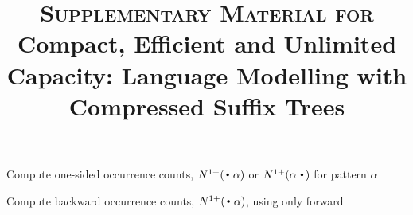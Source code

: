 \documentclass[11pt,a4paper]{article}
\title{\textsc{Supplementary Material for} \\
Compact, Efficient and Unlimited Capacity:
    Language Modelling with Compressed Suffix Trees}
\date{}
\begin{document}
\maketitle

\begin{algorithm}[htpb]
  \caption{Compute one-sided occurrence counts, $\nlplus{\dotpat}$ or $\nlplus{\patdot}$ for pattern $\alpha$ 
    \label{alg:n1plus}}
  \begin{algorithmic}[1]
        \EndIf
      \State {}
    \EndFunction
  \end{algorithmic}
\label{alg-nlplus}
\end{algorithm}


\begin{algorithm*}[htpb]
  \caption{Compute backward occurrence counts, $\nlplus{\dotpat}$, using only forward \CST 
    \label{alg:n1plusback_wt}}
  \begin{algorithmic}[1]
    \State {}
    \EndFunction
  \end{algorithmic}
\end{algorithm*}
\end{document}
